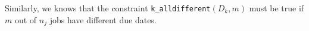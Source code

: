 Similarly, we knows that the constraint \texttt{k\_alldifferent}$(D_k, m)$ must
be true if $m$ out of $n_j$ jobs have different due dates.
\begin{comment}
\section{Decompositions}
\subsection{Move-back decomposition}
Turn it into a satisfiability problem for $\L_{\text{max,inc}} - 1$.


Another possible way to set up a branch-and-bound search for solutions works as
follows: first, consider all jobs to be assigned to individual batches, i.e.
$B_j = k_j \; \forall j \in J$. Compute the $\Lmax$ for this schedule. Then, at
every level of the search tree, move a job $j$ into any earlier batch $k \leq
k_j$, but only if that move does not violate $k$'s capacity and only if it
improves $\Lmax$. Not moving a job is permissible but no two jobs 
\end{comment}
